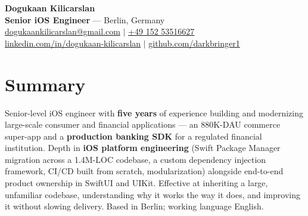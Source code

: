 \documentclass[a4paper,11pt]{article}
\begin{document}
 
\begin{center}
    \textbf{\huge Dogukaan Kilicarslan} \\ \vspace{4pt}
    \small \textbf{Senior iOS Engineer} --- Berlin, Germany \\ \vspace{4pt}
    \href{mailto:dogukaankilicarslan@gmail.com}{dogukaankilicarslan@gmail.com} $|$
    \href{tel:+4915253516627}{+49 152 53516627} \\ \vspace{2pt}
    \href{https://www.linkedin.com/in/dogukaan-kilicarslan}{linkedin.com/in/dogukaan-kilicarslan} $|$
    \href{https://github.com/darkbringer1}{github.com/darkbringer1}
\end{center}
 
\section{Summary}
\small{Senior-level iOS engineer with \textbf{five years} of experience building and modernizing large-scale consumer and financial applications --- an 880K-DAU commerce super-app and a \textbf{production banking SDK} for a regulated financial institution. Depth in \textbf{iOS platform engineering} (Swift Package Manager migration across a 1.4M-LOC codebase, a custom dependency injection framework, CI/CD built from scratch, modularization) alongside end-to-end product ownership in SwiftUI and UIKit. Effective at inheriting a large, unfamiliar codebase, understanding why it works the way it does, and improving it without slowing delivery. Based in Berlin; working language English.}
 
\end{document}
